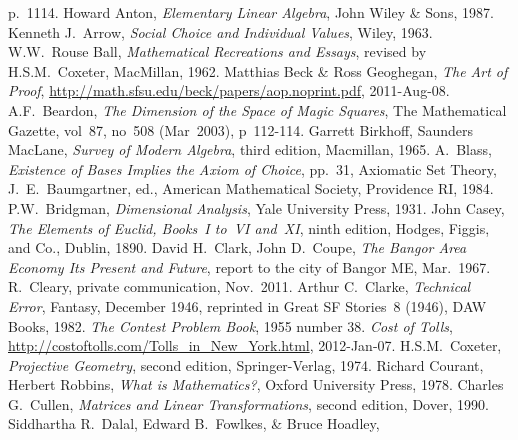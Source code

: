 \begin{thebibliography}{\makebox[2em][c]{{}\hfil{}}}
  p.~1114.
  Howard Anton,
  \emph{Elementary Linear Algebra},
  John Wiley \& Sons,
  1987.
  Kenneth J.~Arrow,
  \emph{Social Choice and Individual Values},
  Wiley,
  1963.
 W.W.~Rouse Ball,
 \emph{Mathematical Recreations and Essays},
 revised by H.S.M.~Coxeter,
 MacMillan,
 1962.
  Matthias Beck \& Ross Geoghegan,
  \emph{The Art of Proof},
  \url{http://math.sfsu.edu/beck/papers/aop.noprint.pdf},
  2011-Aug-08.
  A.F.\ Beardon,
  \emph{The Dimension of the Space of Magic Squares},
  The Mathematical Gazette,
  vol~87, no~508 (Mar~2003), p~112-114.
  Garrett Birkhoff, Saunders MacLane,
  \emph{Survey of Modern Algebra},
  third edition,
  Macmillan, 
  1965.
  A.~Blass,
  \emph{Existence of Bases Implies the Axiom of Choice},
  pp.\ 31,
  Axiomatic Set Theory, J.\ E.\ Baumgartner, ed.,
  American Mathematical Society,
  Providence RI, 1984.
  P.W.~Bridgman,
  \emph{Dimensional Analysis},
  Yale University Press,
  1931.
  John Casey,
  \emph{The Elements of Euclid, Books~I to~VI and~XI},
  ninth edition,
  Hodges, Figgis, and Co.,
  Dublin,
  1890.
  David H.\ Clark, John D.\ Coupe,
  \emph{The Bangor Area Economy Its Present and Future},
  report to the city of Bangor ME,
  Mar.\ 1967.
  R.~Cleary,
  private communication,
  Nov.\ 2011.
  Arthur C.~Clarke,
  \emph{Technical Error},
  Fantasy, December 1946,
  reprinted in
  Great SF Stories~8 (1946),
  DAW Books, 1982. 
  \emph{The Contest Problem Book},
  1955 number 38.
  \emph{Cost of Tolls},
  \url{http://costoftolls.com/Tolls_in_New_York.html},
  2012-Jan-07.
  H.S.M.~Coxeter,
  \emph{Projective Geometry},
  second edition,
  Springer-Verlag, 1974.
  Richard Courant, Herbert Robbins,
  \emph{What is Mathematics?},
  Oxford University Press, 1978.
  Charles G.\ Cullen,
  \emph{Matrices and Linear Transformations},
  second edition,
  Dover,
  1990.
  Siddhartha R.~Dalal, Edward B.~Fowlkes, \& Bruce Hoadley,

\end{thebibliography}
